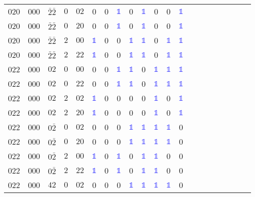 \begin{longtable*}{c| cccccccccccccccccccc }
020& 000& $\bar{2}\bar{2}$& $0$& $02$& 0& 0& \textcolor{blue}{$\mathds{1}$}& 0& \textcolor{blue}{$\mathds{1}$}& 0& 0& \textcolor{blue}{$\mathds{1}$}\\
020& 000& $\bar{2}\bar{2}$& $0$& $20$& 0& 0& \textcolor{blue}{$\mathds{1}$}& 0& \textcolor{blue}{$\mathds{1}$}& 0& 0& \textcolor{blue}{$\mathds{1}$}\\
020& 000& $\bar{2}\bar{2}$& $2$& $00$& \textcolor{blue}{$\mathds{1}$}& 0& 0& \textcolor{blue}{$\mathds{1}$}& \textcolor{blue}{$\mathds{1}$}& 0& \textcolor{blue}{$\mathds{1}$}& \textcolor{blue}{$\mathds{1}$}\\
020& 000& $\bar{2}\bar{2}$& $2$& $22$& \textcolor{blue}{$\mathds{1}$}& 0& 0& \textcolor{blue}{$\mathds{1}$}& \textcolor{blue}{$\mathds{1}$}& 0& \textcolor{blue}{$\mathds{1}$}& \textcolor{blue}{$\mathds{1}$}\\
022& 000& $02$& $0$& $00$& 0& 0& \textcolor{blue}{$\mathds{1}$}& \textcolor{blue}{$\mathds{1}$}& 0& \textcolor{blue}{$\mathds{1}$}& \textcolor{blue}{$\mathds{1}$}& \textcolor{blue}{$\mathds{1}$}\\
022& 000& $02$& $0$& $22$& 0& 0& \textcolor{blue}{$\mathds{1}$}& \textcolor{blue}{$\mathds{1}$}& 0& \textcolor{blue}{$\mathds{1}$}& \textcolor{blue}{$\mathds{1}$}& \textcolor{blue}{$\mathds{1}$}\\
022& 000& $02$& $2$& $02$& \textcolor{blue}{$\mathds{1}$}& 0& 0& 0& 0& \textcolor{blue}{$\mathds{1}$}& 0& \textcolor{blue}{$\mathds{1}$}\\
022& 000& $02$& $2$& $20$& \textcolor{blue}{$\mathds{1}$}& 0& 0& 0& 0& \textcolor{blue}{$\mathds{1}$}& 0& \textcolor{blue}{$\mathds{1}$}\\
022& 000& $0\bar{2}$& $0$& $02$& 0& 0& 0& \textcolor{blue}{$\mathds{1}$}& \textcolor{blue}{$\mathds{1}$}& \textcolor{blue}{$\mathds{1}$}& \textcolor{blue}{$\mathds{1}$}& 0\\
022& 000& $0\bar{2}$& $0$& $20$& 0& 0& 0& \textcolor{blue}{$\mathds{1}$}& \textcolor{blue}{$\mathds{1}$}& \textcolor{blue}{$\mathds{1}$}& \textcolor{blue}{$\mathds{1}$}& 0\\
022& 000& $0\bar{2}$& $2$& $00$& \textcolor{blue}{$\mathds{1}$}& 0& \textcolor{blue}{$\mathds{1}$}& 0& \textcolor{blue}{$\mathds{1}$}& \textcolor{blue}{$\mathds{1}$}& 0& 0\\
022& 000& $0\bar{2}$& $2$& $22$& \textcolor{blue}{$\mathds{1}$}& 0& \textcolor{blue}{$\mathds{1}$}& 0& \textcolor{blue}{$\mathds{1}$}& \textcolor{blue}{$\mathds{1}$}& 0& 0\\
022& 000& $42$& $0$& $02$& 0& 0& 0& \textcolor{blue}{$\mathds{1}$}& \textcolor{blue}{$\mathds{1}$}& \textcolor{blue}{$\mathds{1}$}& \textcolor{blue}{$\mathds{1}$}& 0\\

\end{longtable*}
